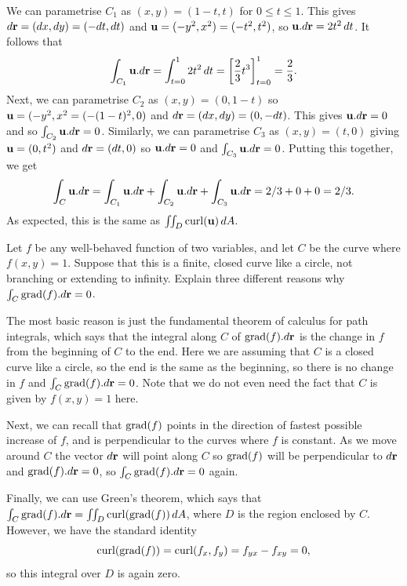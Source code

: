 \documentclass[a4paper]{amsart}
\renewenvironment{solution}{\SolutionInline}{\endSolutionInline}
\begin{document}
\begin{solution}
\begin{center}
 \end{center}
 We can parametrise $C_1$ as $(x,y)=(1-t,t)$ for $0\leq t\leq 1$.
 This gives $d\mathbf{r}=(dx,dy)=(-dt,dt)$ and $\mathbf{u}=(-y^2,x^2)=(-t^2,t^2)$,
 so $\mathbf{u}.d\mathbf{r}=2t^2\,dt$.  It follows that
 \[ \int_{C_1} \vu.d\vr = \int_{t=0}^1 2t^2\,dt =
     \CH{\frac{2}{3}t^3}_{t=0}^1 = \frac{2}{3}.
 \] 
 Next, we can parametrise $C_2$ as $(x,y)=(0,1-t)$ so
 $\mathbf{u}=(-y^2,x^2=(-(1-t)^2,0)$ and $d\mathbf{r}=(dx,dy)=(0,-dt)$.  This gives
 $\mathbf{u}.d\mathbf{r}=0$ and so $\int_{C_2}\mathbf{u}.d\mathbf{r}=0$.  Similarly, we can
 parametrise $C_3$ as $(x,y)=(t,0)$ giving $\mathbf{u}=(0,t^2)$ and
 $d\mathbf{r}=(dt,0)$ so $\mathbf{u}.d\mathbf{r}=0$ and $\int_{C_3}\mathbf{u}.d\mathbf{r}=0$.  Putting
 this together, we get 
 \[ \int_C\mathbf{u}.d\mathbf{r} =
     \int_{C_1}\mathbf{u}.d\mathbf{r} + \int_{C_2}\mathbf{u}.d\mathbf{r} + \int_{C_3}\mathbf{u}.d\mathbf{r} =
      2/3 + 0 + 0 = 2/3.
 \]
 As expected, this is the same as $\iint_D\operatorname{curl}(\mathbf{u})\,dA$.
\end{solution}

\begin{exercise}
 Let $f$ be any well-behaved function of two variables, and let $C$ be
 the curve where $f(x,y)=1$.  Suppose that this is a finite, closed
 curve like a circle, not branching or extending to infinity.  Explain
 three different reasons why $\int_C\operatorname{grad}(f).d\mathbf{r}=0$.
\end{exercise}
\begin{solution}
 The most basic reason is just the fundamental theorem of calculus for
 path integrals, which says that the integral along $C$ of
 $\operatorname{grad}(f).d\mathbf{r}$ is the change in $f$ from the beginning of $C$ to the
 end.  Here we are assuming that $C$ is a closed curve like a circle,
 so the end is the same as the beginning, so there is no change in $f$
 and $\int_C\operatorname{grad}(f).d\mathbf{r}=0$.  Note that we do not even need the fact
 that $C$ is given by $f(x,y)=1$ here.

 Next, we can recall that $\operatorname{grad}(f)$ points in the direction of
 fastest possible increase of $f$, and is perpendicular to the curves
 where $f$ is constant.  As we move around $C$ the vector $d\mathbf{r}$ will
 point along $C$ so $\operatorname{grad}(f)$ will be perpendicular to $d\mathbf{r}$ and
 $\operatorname{grad}(f).d\mathbf{r}=0$, so $\int_C\operatorname{grad}(f).d\mathbf{r}=0$ again.

 Finally, we can use Green's theorem, which says that
 $\int_C\operatorname{grad}(f).d\mathbf{r}=\iint_D\operatorname{curl}(\operatorname{grad}(f))\,dA$, where $D$ is the
 region enclosed by $C$.  However, we have the standard identity
 \[ \operatorname{curl}(\operatorname{grad}(f)) = \operatorname{curl}(f_x,f_y) = f_{yx}-f_{xy} = 0, \]
 so this integral over $D$ is again zero.
\end{solution}
\end{document}

